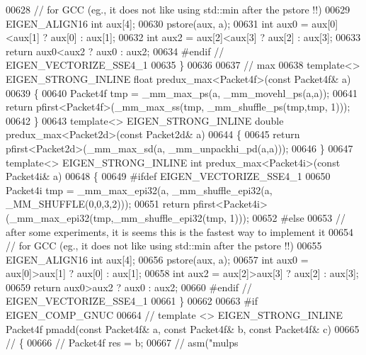 \begin{DoxyCode}
00628   \textcolor{comment}{// for GCC (eg., it does not like using std::min after the pstore !!)}
00629   EIGEN\_ALIGN16 \textcolor{keywordtype}{int} aux[4];
00630   pstore(aux, a);
00631   \textcolor{keywordtype}{int} aux0 = aux[0]<aux[1] ? aux[0] : aux[1];
00632   \textcolor{keywordtype}{int} aux2 = aux[2]<aux[3] ? aux[2] : aux[3];
00633   \textcolor{keywordflow}{return} aux0<aux2 ? aux0 : aux2;
00634 \textcolor{preprocessor}{#endif // EIGEN\_VECTORIZE\_SSE4\_1}
00635 \}
00636 
00637 \textcolor{comment}{// max}
00638 \textcolor{keyword}{template}<> EIGEN\_STRONG\_INLINE \textcolor{keywordtype}{float} predux\_max<Packet4f>(\textcolor{keyword}{const} Packet4f& a)
00639 \{
00640   Packet4f tmp = \_mm\_max\_ps(a, \_mm\_movehl\_ps(a,a));
00641   \textcolor{keywordflow}{return} pfirst<Packet4f>(\_mm\_max\_ss(tmp, \_mm\_shuffle\_ps(tmp,tmp, 1)));
00642 \}
00643 \textcolor{keyword}{template}<> EIGEN\_STRONG\_INLINE \textcolor{keywordtype}{double} predux\_max<Packet2d>(\textcolor{keyword}{const} Packet2d& a)
00644 \{
00645   \textcolor{keywordflow}{return} pfirst<Packet2d>(\_mm\_max\_sd(a, \_mm\_unpackhi\_pd(a,a)));
00646 \}
00647 \textcolor{keyword}{template}<> EIGEN\_STRONG\_INLINE \textcolor{keywordtype}{int} predux\_max<Packet4i>(\textcolor{keyword}{const} Packet4i& a)
00648 \{
00649 \textcolor{preprocessor}{#ifdef EIGEN\_VECTORIZE\_SSE4\_1}
00650   Packet4i tmp = \_mm\_max\_epi32(a, \_mm\_shuffle\_epi32(a, \_MM\_SHUFFLE(0,0,3,2)));
00651   \textcolor{keywordflow}{return} pfirst<Packet4i>(\_mm\_max\_epi32(tmp,\_mm\_shuffle\_epi32(tmp, 1)));
00652 \textcolor{preprocessor}{#else}
00653   \textcolor{comment}{// after some experiments, it is seems this is the fastest way to implement it}
00654   \textcolor{comment}{// for GCC (eg., it does not like using std::min after the pstore !!)}
00655   EIGEN\_ALIGN16 \textcolor{keywordtype}{int} aux[4];
00656   pstore(aux, a);
00657   \textcolor{keywordtype}{int} aux0 = aux[0]>aux[1] ? aux[0] : aux[1];
00658   \textcolor{keywordtype}{int} aux2 = aux[2]>aux[3] ? aux[2] : aux[3];
00659   \textcolor{keywordflow}{return} aux0>aux2 ? aux0 : aux2;
00660 \textcolor{preprocessor}{#endif // EIGEN\_VECTORIZE\_SSE4\_1}
00661 \}
00662 
00663 \textcolor{preprocessor}{#if EIGEN\_COMP\_GNUC}
00664 \textcolor{comment}{// template <> EIGEN\_STRONG\_INLINE Packet4f pmadd(const Packet4f&  a, const Packet4f&  b, const Packet4f& 
       c)}
00665 \textcolor{comment}{// \{}
00666 \textcolor{comment}{//   Packet4f res = b;}
00667 \textcolor{comment}{//   asm("mulps %
}
\end{DoxyCode}
